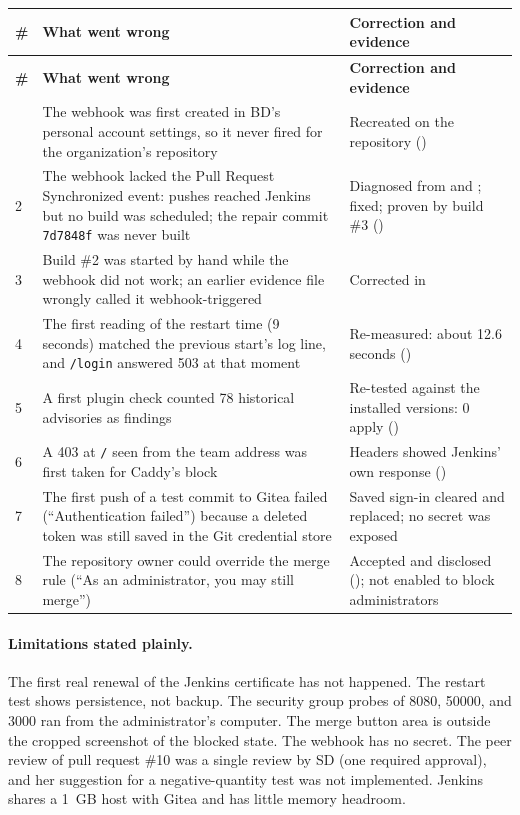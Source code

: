 \begin{tabularx}{\linewidth}{L{0.8cm}L{5.1cm}Y}
\caption{Failed tests and mistakes of this assignment, and the corrections\label{Table:JenkinsFailed}}\\
\toprule \textbf{\#} & \textbf{What went wrong} & \textbf{Correction and evidence}\\ \midrule
\endfirsthead
\toprule \textbf{\#} & \textbf{What went wrong} & \textbf{Correction and evidence}\\ \midrule
\endhead \bottomrule {} & The webhook was first created in BD's personal account settings, so it never fired for the organization's repository & Recreated on the repository ()\\
2 & The webhook lacked the Pull Request Synchronized event: pushes reached Jenkins but no build was scheduled; the repair commit \texttt{7d7848f} was never built & Diagnosed from  and ; fixed; proven by build \#3 ()\\
3 & Build \#2 was started by hand while the webhook did not work; an earlier evidence file wrongly called it webhook-triggered & Corrected in \\
4 & The first reading of the restart time (9 seconds) matched the previous start's log line, and \texttt{/login} answered 503 at that moment & Re-measured: about 12.6 seconds ()\\
5 & A first plugin check counted 78 historical advisories as findings & Re-tested against the installed versions: 0 apply ()\\
6 & A 403 at \texttt{/} seen from the team address was first taken for Caddy's block & Headers showed Jenkins' own response ()\\
7 & The first push of a test commit to Gitea failed (``Authentication failed'') because a deleted token was still saved in the Git credential store & Saved sign-in cleared and replaced; no secret was exposed\\
8 & The repository owner could override the merge rule (``As an administrator, you may still merge'') & Accepted and disclosed (); not enabled to block administrators\\
\end{tabularx}

\paragraph{Limitations stated plainly.} The first real renewal of the Jenkins certificate has not happened. The restart test shows persistence, not backup. The security
group probes of 8080, 50000, and 3000 ran from the administrator's computer. The merge button area is outside the cropped screenshot of the blocked state. The
webhook has no secret. The peer review of pull request \#10 was a single review by SD (one required approval), and her suggestion for a negative-quantity test was
not implemented. Jenkins shares a 1~GB host with Gitea and has little memory headroom.
